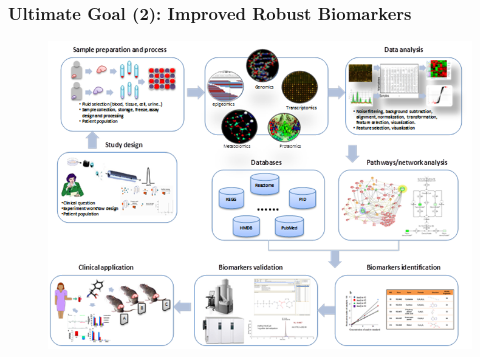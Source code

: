 \documentclass{beamer}
\begin{document}
  
   \begin{frame}
   	\frametitle{Ultimate Goal (2): Improved Robust Biomarkers}
   	\begin{figure}[ht]
   		\centering
   		\includegraphics[height=0.8\textheight]{images/Imagen26.png}
   	\end{figure} 
   \end{frame}
  
 
  
  
\end{document}
